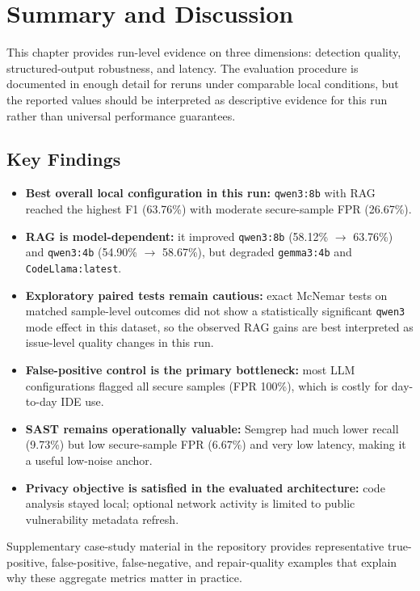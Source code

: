 \section{Summary and Discussion}
\label{sec:eval-summary}

This chapter provides run-level evidence on three dimensions: detection quality, structured-output robustness, and latency. The evaluation procedure is documented in enough detail for reruns under comparable local conditions, but the reported values should be interpreted as descriptive evidence for this run rather than universal performance guarantees.

\subsection*{Key Findings}

\begin{itemize}
  \item \textbf{Best overall local configuration in this run:} \texttt{qwen3:8b} with RAG reached the highest F1 (63.76\%) with moderate secure-sample FPR (26.67\%).
  \item \textbf{RAG is model-dependent:} it improved \texttt{qwen3:8b} (58.12\% $\rightarrow$ 63.76\%) and \texttt{qwen3:4b} (54.90\% $\rightarrow$ 58.67\%), but degraded \texttt{gemma3:4b} and \texttt{CodeLlama:latest}.
  \item \textbf{Exploratory paired tests remain cautious:} exact McNemar tests on matched sample-level outcomes did not show a statistically significant \texttt{qwen3} mode effect in this dataset, so the observed RAG gains are best interpreted as issue-level quality changes in this run.
  \item \textbf{False-positive control is the primary bottleneck:} most LLM configurations flagged all secure samples (FPR 100\%), which is costly for day-to-day IDE use.
  \item \textbf{SAST remains operationally valuable:} Semgrep had much lower recall (9.73\%) but low secure-sample FPR (6.67\%) and very low latency, making it a useful low-noise anchor.
  \item \textbf{Privacy objective is satisfied in the evaluated architecture:} code analysis stayed local; optional network activity is limited to public vulnerability metadata refresh.
\end{itemize}

Supplementary case-study material in the repository provides representative true-positive, false-positive, false-negative, and repair-quality examples that explain why these aggregate metrics matter in practice.

